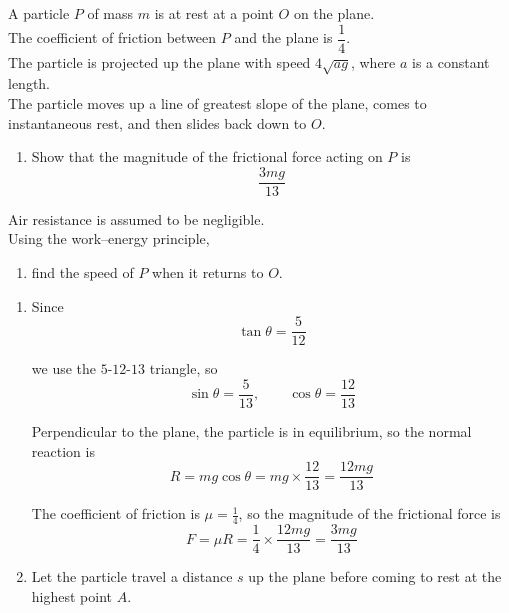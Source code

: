 \documentclass[leqno]{article}
\begin{document}
\begin{enumerate}[
  label=\textbf{\arabic*.},
  leftmargin=*,
  topsep=0pt,
  partopsep=0pt,
  parsep=0pt
]
A particle $P$ of mass $m$ is at rest at a point $O$ on the plane. \\

The coefficient of friction between $P$ and the plane is $\dfrac{1}{4}$. \\

The particle is projected up the plane with speed $4\sqrt{ag}$, where $a$ is a constant length. \\

The particle moves up a line of greatest slope of the plane, comes to instantaneous rest, and then slides back down to $O$. \\

\begin{enumerate}[label=\textbf{(\alph*)}]
  \item Show that the magnitude of the frictional force acting on $P$ is
  \[
  \dfrac{3mg}{13}
  \]
\end{enumerate}
Air resistance is assumed to be negligible. \\

Using the work--energy principle, \\

\begin{enumerate}[label=\textbf{(\alph*)}, resume]
  \item find the speed of $P$ when it returns to $O$.  \\
\end{enumerate}

\vspace*{10pt}

\begin{djsSolution}
\begin{enumerate}[label=\textbf{(\alph*)}]
  \item Since 
  \[
  \tan\theta=\frac{5}{12}
  \]

  we use the $5$-$12$-$13$ triangle, so
  \[
  \sin\theta=\frac{5}{13},\qquad \cos\theta=\frac{12}{13}
  \]

  Perpendicular to the plane, the particle is in equilibrium, so the normal reaction is
  \[
  R=mg\cos\theta=mg\times \frac{12}{13}=\frac{12mg}{13}
  \]

  The coefficient of friction is $\mu=\frac14$, so the magnitude of the frictional force is
  \[
  F=\mu R=\frac14\times \frac{12mg}{13}=\frac{3mg}{13}
  \]

  \item Let the particle travel a distance $s$ up the plane before coming to rest at the highest point $A$.


\end{enumerate}
\end{djsSolution}
\end{enumerate}
\end{document}
